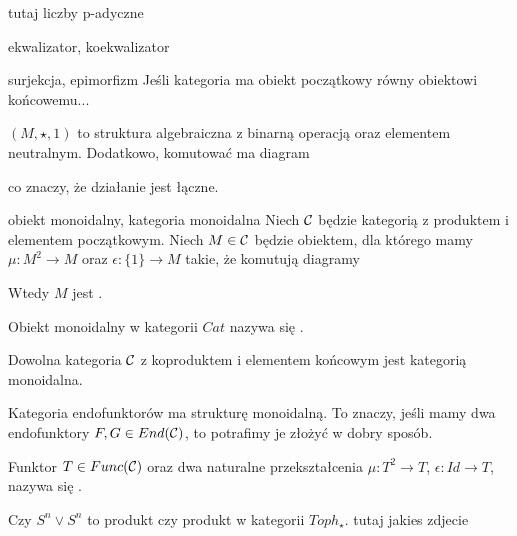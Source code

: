 tutaj liczby p-adyczne

ekwalizator, koekwalizator

\begin{definition}{surjekcja, epimorfizm}{}
  Jeśli kategoria ma obiekt początkowy równy obiektowi końcowemu...
\end{definition}

 $(M, \star, 1)$ to struktura algebraiczna z binarną operacją oraz elementem neutralnym. Dodatkowo, komutować ma diagram 
\begin{center}
\end{center}
co znaczy, że działanie jest łączne.

\begin{definition}{obiekt monoidalny, kategoria monoidalna}{}
  Niech $\mathcal{C}$ będzie kategorią z produktem i elementem początkowym. Niech $M\in \mathcal{C}$ będzie obiektem, dla którego mamy $\mu:M^2\to M$ oraz $\epsilon: \{1\}\to M$ takie, że komutują diagramy
  \begin{center}
  \end{center}
  \begin{center}
  \end{center}
  Wtedy $M$ jest .
  
  Obiekt monoidalny w kategorii $Cat$ nazywa się .
\end{definition}

\begin{example}[m]
\item Dowolna kategoria $\mathcal{C}$ z koproduktem i elementem końcowym jest kategorią monoidalna.
\item Kategoria endofunktorów ma strukturę monoidalną. To znaczy, jeśli mamy dwa endofunktory $F, G\in End(\mathcal{C})$, to potrafimy je złożyć w dobry sposób.

  Funktor $T\in Func(\mathcal{C})$ oraz dwa naturalne przekształcenia $\mu:T^2\to T$, $\epsilon: Id\to T$, nazywa się .
\end{example}

Czy $S^n\vee S^n$ to produkt czy produkt w kategorii $Toph_\star$. tutaj jakies zdjecie






